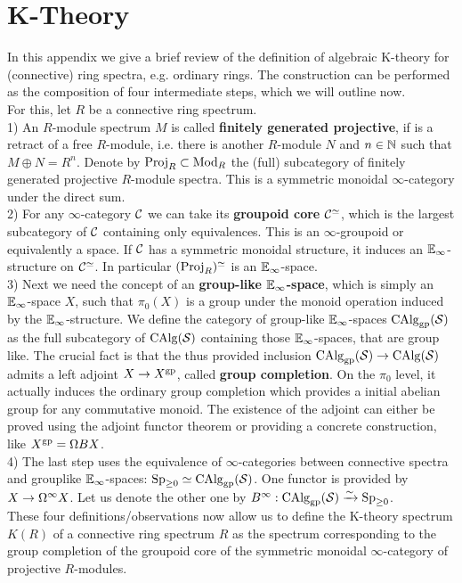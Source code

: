 \appendix
\chapter{K-Theory}
In this appendix we give a brief review of the definition of algebraic K-theory for (connective) ring spectra, e.g. ordinary rings. The construction can be performed as the composition of four intermediate steps, which we will outline now. \\
For this, let $R$ be a connective ring spectrum. \\
1) An $R$-module spectrum $M$ is called \textbf{finitely generated projective}, if is a retract of a free $R$-module, i.e. there is another $R$-module $N$ and  $n\in\mathbb{N}$ such that $M\oplus N=R^n$.
Denote by $\operatorname{Proj}_R\subset \operatorname{Mod}_R$ the (full) subcategory of finitely generated projective $R$-module spectra. This is a symmetric monoidal $\infty$-category under the direct sum. \\
2) For any $\infty$-category $\mathcal{C}$ we can take its \textbf{groupoid core} $\mathcal{C}^{\simeq}$, which is the largest subcategory of $\mathcal{C}$ containing only equivalences. This is an $\infty$-groupoid or equivalently a space. If $\mathcal{C}$ has a symmetric monoidal structure, it induces an $\mathbb{E}_\infty$-structure on $\mathcal{C}^{\simeq}$. In particular $(\operatorname{Proj}_R)^{\simeq}$ is an $\mathbb{E}_\infty$-space.\\
3) Next we need the concept of an \textbf{group-like $\mathbb{E}_\infty$-space}, which is simply an $\mathbb{E}_\infty$-space $X$, such that $\pi_0(X)$ is a group under the monoid operation induced by the $\mathbb{E}_\infty$-structure. We define the category of group-like $\mathbb{E}_\infty$-spaces $\operatorname{CAlg}_{\operatorname{gp}}(\mathcal{S})$ as the full subcategory of $\operatorname{CAlg}(\mathcal{S})$ containing those  $\mathbb{E}_\infty$-spaces, that are group like. The crucial fact is that the thus provided inclusion $\operatorname{CAlg}_{\operatorname{gp}}(\mathcal{S})\rightarrow \operatorname{CAlg}(\mathcal{S})$ admits a left adjoint $X\to X^{\operatorname{gp}}$, called \textbf{group completion}. On the $\pi_0$ level, it actually induces the ordinary group completion which provides a initial abelian group for any commutative monoid. The existence of the adjoint can either be proved using the adjoint functor theorem or providing a concrete construction, like $X^{\operatorname{gp}}=\Omega BX$. \\
4) The last step uses the equivalence of $\infty$-categories between connective spectra and grouplike $\mathbb{E}_\infty$-spaces: $\operatorname{Sp}_{\geq 0}\simeq \operatorname{CAlg}_{\operatorname{gp}}(\mathcal{S})$. One functor is provided by $X\rightarrow \Omega^{\infty}X$. Let us denote the other one by $B^\infty:\operatorname{CAlg}_{\operatorname{gp}}(\mathcal{S})\xrightarrow{\sim} \operatorname{Sp}_{\geq 0} $.  \\
These four definitions/observations now allow us to define the K-theory spectrum $K(R)$ of a connective ring spectrum $R$ as the spectrum corresponding to the group completion of the groupoid core of the symmetric monoidal $\infty$-category of projective $R$-modules. 
